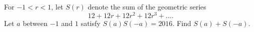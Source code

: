 For $-1 < r < 1$, let $S(r)$ denote the sum of the geometric series \[12 + 12r + 12r^2 + 12r^3 + \ldots.\]Let $a$ between $-1$ and $1$ satisfy $S(a)S(-a)=2016$. Find $S(a) + S(-a)$.